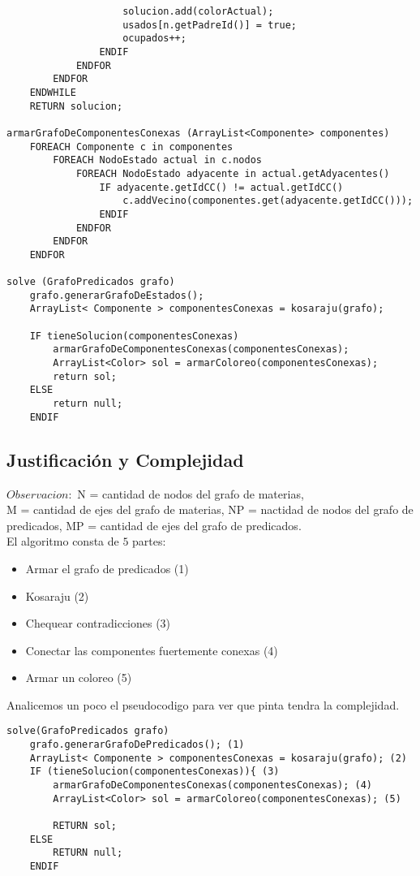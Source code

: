 \begin{verbatim}
                    solucion.add(colorActual);
                    usados[n.getPadreId()] = true;
                    ocupados++;
                ENDIF
            ENDFOR
        ENDFOR
    ENDWHILE
    RETURN solucion;

armarGrafoDeComponentesConexas (ArrayList<Componente> componentes)
    FOREACH Componente c in componentes 
        FOREACH NodoEstado actual in c.nodos 
            FOREACH NodoEstado adyacente in actual.getAdyacentes() 
                IF adyacente.getIdCC() != actual.getIdCC()
                    c.addVecino(componentes.get(adyacente.getIdCC()));
                ENDIF
            ENDFOR
        ENDFOR
    ENDFOR

solve (GrafoPredicados grafo)
    grafo.generarGrafoDeEstados();
    ArrayList< Componente > componentesConexas = kosaraju(grafo);
    
    IF tieneSolucion(componentesConexas)
        armarGrafoDeComponentesConexas(componentesConexas);
        ArrayList<Color> sol = armarColoreo(componentesConexas);
        return sol;
    ELSE
        return null;
    ENDIF
\end{verbatim}
\pagebreak

\subsection{Justificaci\'on y Complejidad}
$Observacion:$ N = cantidad de nodos del grafo de materias,\\ M = cantidad de ejes del grafo de materias, NP = nactidad de nodos del grafo de predicados, MP = cantidad de ejes del grafo de predicados. \\

El algoritmo consta de $5$ partes:

\begin{itemize}
    \item Armar el grafo de predicados (1)
    \item Kosaraju (2)
    \item Chequear contradicciones (3)
    \item Conectar las componentes fuertemente conexas (4)
    \item Armar un coloreo (5)
\end{itemize}

Analicemos un poco el pseudocodigo para ver que pinta tendra la complejidad.

\begin{verbatim}
solve(GrafoPredicados grafo)
    grafo.generarGrafoDePredicados(); (1)
    ArrayList< Componente > componentesConexas = kosaraju(grafo); (2)
    IF (tieneSolucion(componentesConexas)){ (3)
        armarGrafoDeComponentesConexas(componentesConexas); (4)
        ArrayList<Color> sol = armarColoreo(componentesConexas); (5)
		
        RETURN sol;
    ELSE
        RETURN null;
    ENDIF
\end{verbatim}\\

